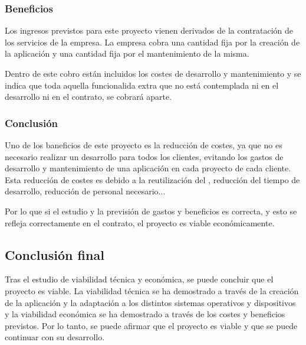 \subsubsection{Beneficios}
\label{subsubsec:analisis_estudio_viabilidad_economica_beneficios}

Los ingresos previstos para este proyecto vienen derivados de la contratación de los servicios de la empresa. La empresa
cobra una cantidad fija por la creación de la aplicación y una cantidad fija por el mantenimiento de la misma. 

Dentro de este cobro están incluidos los costes de desarrollo y mantenimiento y se indica que toda aquella funcionalida extra que no está contemplada
ni en el desarrollo ni en el contrato, se cobrará aparte. 

\subsubsection{Conclusión}
\label{subsubsec:analisis_estudio_viabilidad_economica_conclusion}

Uno de los baneficios de este proyecto es la reducción de costes, ya que no es necesario realizar un desarrollo para todos los clientes, 
evitando los gastos de desarrollo y mantenimiento de una aplicación en cada proyecto de cada cliente. Esta reducción de costes es debido
a la reutilización del , reducción del tiempo de desarrollo, reducción de personal necesario... 

Por lo que si el estudio y la previsión de gastos y beneficios es correcta, y esto se refleja correctamente en el contrato, el proyecto
es viable económicamente.


\subsection{Conclusión final}   
\label{subsec:analisis_estudio_viabilidad_conclusion}

Tras el estudio de viabilidad técnica y económica, se puede concluir que el proyecto es viable. La viabilidad técnica
se ha demostrado a través de la creación de la aplicación y la adaptación a los distintos sistemas operativos y dispositivos
y la viabilidad económica se ha demostrado a través de los costes y beneficios previstos. Por lo tanto, se puede afirmar que
el proyecto es viable y que se puede continuar con su desarrollo.

